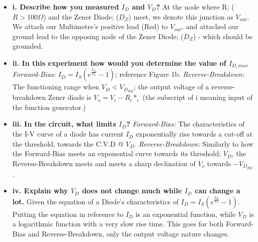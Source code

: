 \documentclass[9pt,a4paper]{report}
\begin{document}
	\begin{itemize}
		\item \textbf{i. Describe how you measured $I_D$ and $V_D$?}
		\subitem At the node where R; ($R>100\Omega$) and the Zener Diode; ($D_Z$) meet, we denote this junction as $V_{out}$. We attach our Multimetre's positive lead (Red) to $V_{out}$, and attached our ground lead to the opposing node of the Zener Diode; ($D_Z$) - which should be grounded.
		\item \textbf{ii. In this experiment how would you determine the value of $I_{D,max}$}
		\subitem \emph{Forward-Bias:} $I_D=I_S(e^{\frac{V_D}{V_T}}-1)$; reference Figure 1b.
		\subitem \emph{Reverse-Breakdown:} The functioning range when $V_D < V_{D_{BR}}$; the output voltage of a reverse-breakdown Zener diode is $V_o=V_i-R_i*_i$ (the subscript of i meaning input of the function generator.)
		\item \textbf{iii. In the circuit, what limits $I_D$?}
		\subitem \emph{Forward-Bias:} The characteristics of the I-V curve of a diode has current $I_D$ exponentially rise towards a cut-off at the threshold, towards the C.V.D @ $V_D$.
		\subitem \emph{Reverse-Breakdown:} Similarly to how the Forward-Bias meets an exponential curve towards its threshold; $V_D$, the Reverse-Breakdown meets and meets a sharp declination of $V_o$ towards $-V_{D_{BR}}$.
		\item \textbf{iv. Explain why $V_D$ does not change much while $I_D$ can change a lot.}
		\subitem Given the equation of a Diode's characteristics of $I_D=I_S(e^{\frac{V_D}{V_T}}-1)$. Putting the equation in reference to $I_D$ is an exponential function, while $V_D$ is a logarithmic function with a very slow rise time. This goes for both Forward-Bias and Reverse-Breakdown, only the output voltage nature changes.
	\end{itemize}
	
\end{document}
